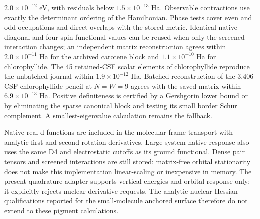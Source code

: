 \documentclass[11pt,a4paper]{article}
\begin{document}
$2.0\times10^{-12}$ eV, with residuals below $1.5\times10^{-13}$ Ha.
Observable contractions use exactly the determinant ordering of the
Hamiltonian. Phase tests cover even and odd occupations and direct
overlaps with the stored metric. Identical native diagonal and four-spin
functional values can be reused when only the screened interaction
changes; an independent matrix reconstruction agrees within
$2.0\times10^{-11}$ Ha for the archived carotene block and
$1.1\times10^{-10}$ Ha for chlorophyllide. The 45 retained-CSF scalar
elements of chlorophyllide reproduce the unbatched journal within
$1.9\times10^{-12}$ Ha. Batched reconstruction of the 3,406-CSF
chlorophyllide pencil at $N=W=9$ agrees with the saved matrix within
$6.9\times10^{-13}$ Ha. Positive definiteness is certified by a Gershgorin lower bound or by
eliminating the sparse canonical block and testing its small border
Schur complement. A smallest-eigenvalue calculation remains the fallback.


Native real d functions are included in the molecular-frame transport
with analytic first and second rotation derivatives. Large-system native
response also uses the same D4 and electrostatic cutoffs as its ground
functional. Dense pair tensors and screened interactions are still stored:
matrix-free orbital stationarity does not make this implementation
linear-scaling or inexpensive in memory. The present quadrature adapter
supports vertical energies and orbital response only; it explicitly rejects
nuclear-derivative requests. The analytic nuclear Hessian qualifications
reported for the small-molecule anchored surface therefore do not extend
to these pigment calculations.
\end{document}

